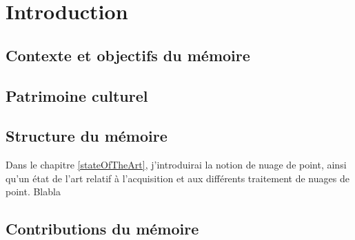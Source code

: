 \chapter{Introduction}

\section*{Contexte et objectifs du mémoire}




\section*{Patrimoine culturel}

\section*{Structure du mémoire}
Dans le chapitre \ref{stateOfTheArt}, j'introduirai la notion de nuage de point, ainsi qu'un état de l'art relatif à l'acquisition et aux différents traitement de nuages de point.
Blabla

\section*{Contributions du mémoire}

